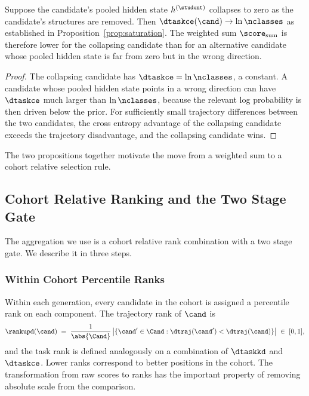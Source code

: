 \begin{proposition}
\label{prop:collapse_reward}
Suppose the candidate's pooled hidden state $h^{(\student)}$ collapses to zero as the candidate's structures are removed. Then $\dtaskce(\cand) \to \ln \nclasses$ as established in Proposition~\ref{prop:saturation}. The weighted sum $\score_{\mathrm{sum}}$ is therefore lower for the collapsing candidate than for an alternative candidate whose pooled hidden state is far from zero but in the wrong direction.
\end{proposition}
\begin{proof}
The collapsing candidate has $\dtaskce = \ln \nclasses$, a constant. A candidate whose pooled hidden state points in a wrong direction can have $\dtaskce$ much larger than $\ln \nclasses$, because the relevant log probability is then driven below the prior. For sufficiently small trajectory differences between the two candidates, the cross entropy advantage of the collapsing candidate exceeds the trajectory disadvantage, and the collapsing candidate wins.
\end{proof}

The two propositions together motivate the move from a weighted sum to a cohort relative selection rule.

\subsection{Cohort Relative Ranking and the Two Stage Gate}

The aggregation we use is a cohort relative rank combination with a two stage gate. We describe it in three steps.

\subsubsection{Within Cohort Percentile Ranks}

Within each generation, every candidate in the cohort is assigned a percentile rank on each component. The trajectory rank of $\cand$ is
\begin{equation}
\rankupd(\cand) \;=\; \frac{1}{\abs{\Cand}} \, \big| \{\cand' \in \Cand : \dtraj(\cand') < \dtraj(\cand)\} \big| \;\in\; [0, 1],
\end{equation}
and the task rank is defined analogously on a combination of $\dtaskkd$ and $\dtaskce$. Lower ranks correspond to better positions in the cohort. The transformation from raw scores to ranks has the important property of removing absolute scale from the comparison.

